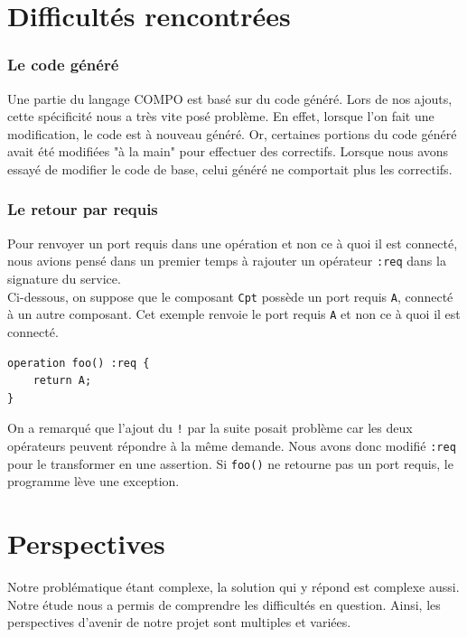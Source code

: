 \documentclass[11pt,a4paper,openany,oneside]{book}
\begin{document}
\section{Difficultés rencontrées}

\subsubsection{Le code généré}

Une partie du langage COMPO est basé sur du code généré. Lors de nos ajouts, cette spécificité nous a très vite posé problème. En effet, lorsque l'on fait une modification, le code est à nouveau généré. Or, certaines portions du code généré avait été modifiées "à la main" pour effectuer des correctifs. Lorsque nous avons essayé de modifier le code de base, celui généré ne comportait plus les correctifs.

\subsubsection{Le retour par requis}
Pour renvoyer un port requis dans une opération et non ce à quoi il est connecté, nous avions pensé dans un premier temps à rajouter un opérateur \texttt{:req} dans la signature du service.\\
Ci-dessous, on suppose que le composant \texttt{Cpt} possède un port requis \texttt{A}, connecté à un autre composant. Cet exemple renvoie le port requis \texttt{A} et non ce à quoi il est connecté.
\begin{lstlisting}[language=COMPO, frame=single, caption=Syntaxe d'une opération avec \texttt{:req} en COMPO]
operation foo() :req {
    return A;
}
\end{lstlisting}
On a remarqué que l'ajout du \texttt{!} par la suite posait problème car les deux opérateurs peuvent répondre à la même demande. Nous avons donc modifié \texttt{:req} pour le transformer en une assertion. Si \texttt{foo()} ne retourne pas un port requis, le programme lève une exception.

\section{Perspectives}

Notre problématique étant complexe, la solution qui y répond est complexe aussi. Notre étude nous a permis de comprendre les difficultés en question. Ainsi, les perspectives d’avenir de notre projet sont multiples et variées.
\end{document}
